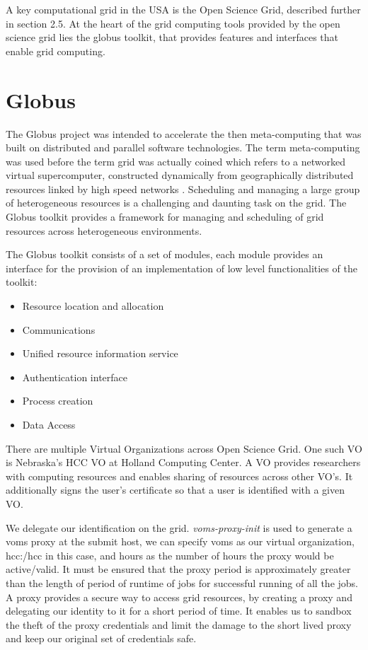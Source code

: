 \documentclass[ms,electronic,double]{nuthesis}
\begin{document}
A key computational grid in the USA is the Open Science Grid, described further 
in section 2.5.
At the heart of the grid computing tools provided by the open science grid lies the globus toolkit, that provides
features and interfaces that enable grid computing. 
\section{Globus}
The Globus project\cite{globus} was intended to accelerate the then meta-computing that was built on 
distributed and parallel software technologies. The term meta-computing was used 
before the term grid was actually coined which refers to 
a networked virtual supercomputer, constructed dynamically from geographically 
distributed resources linked by high speed networks \cite{globus}. Scheduling 
and managing a large group of heterogeneous resources is a challenging and 
daunting task on the grid. The Globus toolkit provides a framework for managing 
and scheduling of grid resources across heterogeneous environments.

The Globus toolkit consists of a set of modules,  each module provides an 
interface for the provision of an implementation of low level functionalities of the toolkit:

\begin{itemize}
  \item{Resource location and allocation} 
  \item{Communications}
  \item{Unified resource information service}
  \item{Authentication interface}
  \item{Process creation}
  \item{Data Access}
\end{itemize}

There are multiple Virtual Organizations across Open Science Grid. One such VO 
is Nebraska's HCC VO at Holland Computing Center. A VO provides researchers with 
computing resources and enables sharing of resources across other VO's. It additionally signs the user's certificate so that a user is identified with a given VO.

We delegate our identification on the grid. \emph{voms-proxy-init}
is used to generate a voms proxy at the submit host, we can specify voms as our 
virtual organization, hcc:/hcc in this case, and hours as the number of hours the proxy would be 
active/valid. It must be ensured that the proxy period is approximately greater than the 
length of period of runtime of jobs for successful running of all the jobs. A 
proxy provides a secure way to access grid resources, by creating a proxy and 
delegating our identity to it for a short period of time. It enables us to sandbox 
the theft of the proxy credentials and limit the damage to the short lived proxy 
and keep our original set of credentials safe.
\end{document}
